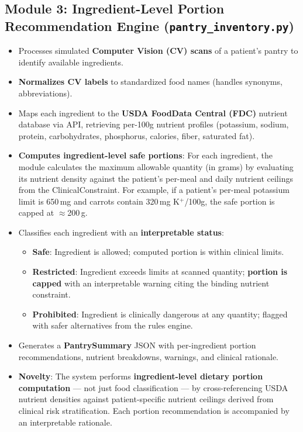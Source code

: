 \documentclass[a4paper,12pt]{article}
\begin{document}
\subsection*{Module 3: Ingredient-Level Portion Recommendation Engine (\texttt{pantry\_inventory.py})}
\begin{itemize}[itemsep=0.3em]
    \item Processes simulated \textbf{Computer Vision (CV) scans} of a patient's pantry to identify available ingredients.
    \item \textbf{Normalizes CV labels} to standardized food names (handles synonyms, abbreviations).
    \item Maps each ingredient to the \textbf{USDA FoodData Central (FDC)} nutrient database via API, retrieving per-100g nutrient profiles (potassium, sodium, protein, carbohydrates, phosphorus, calories, fiber, saturated fat).
    \item \textbf{Computes ingredient-level safe portions}: For each ingredient, the module calculates the maximum allowable quantity (in grams) by evaluating its nutrient density against the patient's per-meal and daily nutrient ceilings from the ClinicalConstraint. For example, if a patient's per-meal potassium limit is 650\,mg and carrots contain 320\,mg K$^+$/100g, the safe portion is capped at $\approx$200\,g.
    \item Classifies each ingredient with an \textbf{interpretable status}:
    \begin{itemize}
        \item \textbf{Safe}: Ingredient is allowed; computed portion is within clinical limits.
        \item \textbf{Restricted}: Ingredient exceeds limits at scanned quantity; \textbf{portion is capped} with an interpretable warning citing the binding nutrient constraint.
        \item \textbf{Prohibited}: Ingredient is clinically dangerous at any quantity; flagged with safer alternatives from the rules engine.
    \end{itemize}
    \item Generates a \textbf{PantrySummary} JSON with per-ingredient portion recommendations, nutrient breakdowns, warnings, and clinical rationale.
    \item \textbf{Novelty}: The system performs \textbf{ingredient-level dietary portion computation} --- not just food classification --- by cross-referencing USDA nutrient densities against patient-specific nutrient ceilings derived from clinical risk stratification. Each portion recommendation is accompanied by an interpretable rationale.
\end{itemize}
\end{document}
